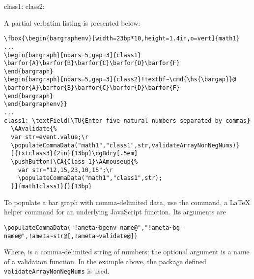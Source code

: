 \documentclass{article}
\edef\amtIndent{\the\parindent}
\begin{document}
\noindent{}%
\begin{minipage}[c]{222pt}
class1:
  \cgBdry[.5em]
  \vcgBdry[4bp]
class2: \cgBdry[.5em]
\end{minipage}\cgBdry[.5em]
\cgBdry[.5em]
\vcgBdry[6pt]
A partial verbatim listing is presented below:
\begin{Verbatim}[xleftmargin=\amtIndent,fontsize=\small,commandchars={!~@}]
\fbox{\begin{bargraphenv}[width=23bp*10,height=1.4in,o=vert]{math1}
...
\begin{bargraph}[nbars=5,gap=3]{class1}
\barfor{A}\barfor{B}\barfor{C}\barfor{D}\barfor{F}
\end{bargraph}
\begin{bargraph}[nbars=5,gap=3]{class2}!textbf~\cmd{\hs{\bargap}}@
\barfor{A}\barfor{B}\barfor{C}\barfor{D}\barfor{F}
\end{bargraph}
\end{bargraphenv}}
...
class1: \textField[\TU{Enter five natural numbers separated by commas}
  \AAvalidate{%
  var str=event.value;\r
  \populateCommaData("math1","class1",str,validateArrayNonNegNums)}
  ]{txtclass3}{2in}{13bp}\cgBdry[.5em]
  \pushButton[\CA{Class 1}\AAmouseup{%
    var str="12,15,23,10,15";\r
    \populateCommaData("math1","class1",str);
  }]{math1class1}{}{13bp}
\end{Verbatim}
To populate a bar graph with comma-delimited data, use the  command, a {\LaTeX} helper
command for an underlying JavaScript function. Its arguments are
\begin{Verbatim}[xleftmargin=\amtIndent,fontsize=\small,commandchars={!~@}]
\populateCommaData("!ameta~bgenv-name@","!ameta~bg-name@",!ameta~str@[,!ameta~validate@])
\end{Verbatim}
Where,  is a comma-delimited string of numbers; the optional  argument
is a name of a validation function. In the example above, the package defined
\texttt{validateArrayNonNegNums} is used.
\end{document}
